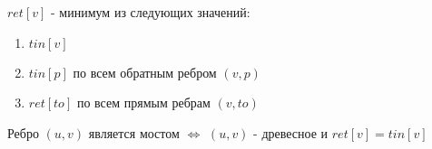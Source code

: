 \begin{proposition}
  $ret[v]$ - минимум из следующих значений:

  \begin{enumerate}
    \item $tin[v]$
    \item $tin[p]$ по всем обратным ребром $(v, p)$
    \item $ret[to]$ по всем прямым ребрам $(v, to)$
  \end{enumerate}
\end{proposition}

\begin{proposition}
  Ребро $(u, v)$ является мостом $\Leftrightarrow$ $(u, v)$ - древесное и $ret[v] = tin[v]$
\end{proposition}